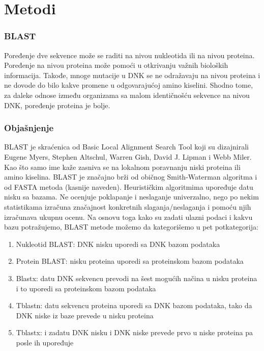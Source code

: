 \chapter{Metodi}

\subsection{BLAST}
Poređenje dve sekvence može se raditi na nivou nukleotida ili na nivou proteina. Poređenje na nivou proteina može pomoći u otkrivanju važnih bioloških informacija. Takođe, mnoge mutacije u DNK se ne odražavaju na nivou proteina i ne dovode do bilo kakve promene u odgovarajućoj amino kiselini. Shodno tome, za daleke odnose između organizama sa malom identičnošću sekvence na nivou DNK, poređenje proteina je bolje.


\subsection{Objašnjenje}
BLAST je skraćenica od Basic Local Alignment Search Tool koji su dizajnirali Eugene Myers, Stephen Altschul, Warren Gish, David J. Lipman i Webb Miler. Kao što samo ime kaže zasniva se na lokalnom poravnanju niski proteina ili amino kiselina. BLAST je značajno brži od običnog Smith-Waterman algoritma i od FASTA metoda (kasnije naveden). Heurističkim algoritmima upoređuje datu nisku sa bazama. Ne ocenjuje poklapanje i neslaganje univerzalno, nego po nekim statistikama izračuna značajnost konkretnih slaganja/neslaganja i pomoću njih izračunava ukupnu ocenu. Na osnovu toga kako su zadati ulazni podaci i kakvu bazu potražujemo, BLAST metode možemo da kategorišemo u pet potkategorija:
\begin{enumerate}
\item Nukleotid BLAST: DNK nisku uporedi sa DNK bazom podataka
\item Protein BLAST: nisku proteina uporedi sa proteinskom bazom podataka
\item Blastx: datu DNK sekvencu prevodi na šest mogućih načina u nisku proteina i to uporedi sa proteinskom bazom podataka
\item Tblastn: datu sekvencu proteina uporedi sa DNK bazom podataka, tako da DNK niske iz baze prevede u nisku  proteina
\item Tblastx: i zadatu DNK nisku i DNK niske prevede prvo u niske proteina pa posle ih upoređuje
\end{enumerate} \vspace{5mm}

